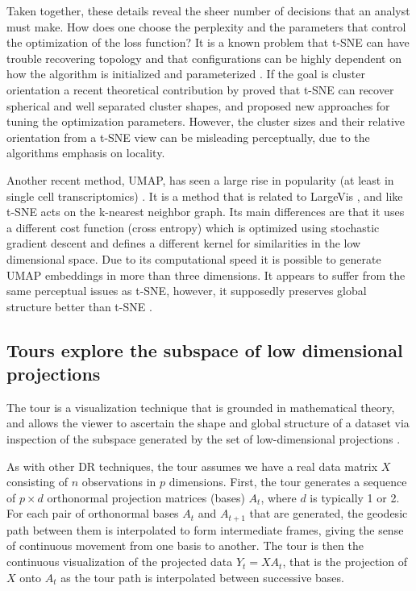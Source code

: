 \documentclass[article,notitle]{jdssv}
\begin{document}
Taken together, these details reveal the sheer number of decisions that an
analyst must make. How does one choose the perplexity and the
parameters that control the optimization of the loss function?
It is a known problem that
t-SNE can have trouble recovering topology and that configurations can be
highly dependent on how the algorithm is initialized and parameterized
\citep{Wattenberg2016-ji, Kobak2019-lm, Melville2020}. If the goal is cluster
orientation a recent theoretical contribution by \citet{Linderman2019-dq} proved that
t-SNE can recover spherical and well separated cluster shapes, and proposed new
approaches for tuning the optimization parameters. However, the cluster sizes
and their relative orientation from a t-SNE view can be misleading
perceptually, due to the algorithms emphasis on locality.

Another recent method, UMAP, has seen a large rise in popularity (at least in
single cell transcriptomics) \citep{McInnes2018-co}. It is a method that is related to
LargeVis \citep{Tang2016-oz}, and like t-SNE acts on the k-nearest neighbor graph.
Its main differences are that it uses a different cost function (cross entropy)
which is optimized using stochastic gradient descent and defines a different
kernel for similarities in the low dimensional space. Due to its computational
speed it is possible to generate UMAP embeddings in more than three dimensions.
It appears to suffer from the same perceptual issues as t-SNE, however, it supposedly preserves global structure better than t-SNE \citep{Coenen2019-to}.

\hypertarget{tours-explore-the-subspace-of-low-dimensional-projections}{%
\subsection{Tours explore the subspace of low dimensional projections}\label{tours-explore-the-subspace-of-low-dimensional-projections}}

The tour is a visualization technique that is grounded in
mathematical theory, and allows the viewer to ascertain
the shape and global structure of a dataset via inspection of the subspace generated by the set of low-dimensional projections \citep{Asimov1985-vp, Buja1986-zr}.

As with other DR techniques, the tour assumes we have a real data matrix
\(X\) consisting of \(n\) observations in \(p\) dimensions. First, the tour generates
a sequence of \(p \times d\) orthonormal projection matrices (bases)
\(A_t\), where \(d\) is typically 1 or 2. For each pair of
orthonormal bases \(A_{t}\) and \(A_{t+1}\) that are generated, the geodesic
path between them is interpolated to form intermediate frames, giving the
sense of continuous movement from one basis to another. The tour is then the
continuous visualization of the projected data \(Y_{t} = XA_{t}\), that is the
projection of \(X\) onto \(A_{t}\) as the tour path is interpolated between
successive bases.
\end{document}
